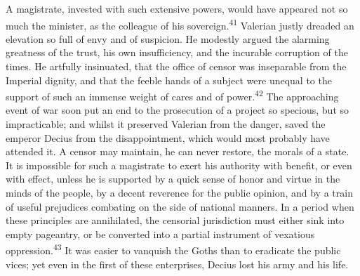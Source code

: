 


A magistrate, invested with such extensive powers, would have
appeared not so much the minister, as the colleague of his
sovereign.\textsuperscript{41} Valerian justly dreaded an elevation so full of
envy and of suspicion. He modestly argued the alarming greatness
of the trust, his own insufficiency, and the incurable corruption
of the times. He artfully insinuated, that the office of censor
was inseparable from the Imperial dignity, and that the feeble
hands of a subject were unequal to the support of such an immense
weight of cares and of power.\textsuperscript{42} The approaching event of war
soon put an end to the prosecution of a project so specious, but
so impracticable; and whilst it preserved Valerian from the
danger, saved the emperor Decius from the disappointment, which
would most probably have attended it. A censor may maintain, he
can never restore, the morals of a state. It is impossible for
such a magistrate to exert his authority with benefit, or even
with effect, unless he is supported by a quick sense of honor and
virtue in the minds of the people, by a decent reverence for the
public opinion, and by a train of useful prejudices combating on
the side of national manners. In a period when these principles
are annihilated, the censorial jurisdiction must either sink into
empty pageantry, or be converted into a partial instrument of
vexatious oppression.\textsuperscript{43} It was easier to vanquish the Goths than
to eradicate the public vices; yet even in the first of these
enterprises, Decius lost his army and his life.




